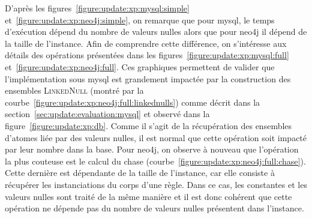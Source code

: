 D'après les figures~\ref{figure:update:xp:mysql:simple} et~\ref{figure:update:xp:neo4j:simple}, on remarque que pour \gls{mysql}, le temps d'exécution dépend du nombre de valeurs nulles alors que pour \gls{neo4j} il dépend de la taille de l'instance.
Afin de comprendre cette différence, on s'intéresse aux détails des opérations présentées dans les figures~\ref{figure:update:xp:mysql:full} et~\ref{figure:update:xp:neo4j:full}.
Ces graphiques permettent de valider que l'implémentation sous \gls{mysql} est grandement impactée par la construction des ensembles \textsc{LinkedNull} (montré par la courbe~\ref{figure:update:xp:neo4j:full:linkednulls}) comme décrit dans la section~\ref{sec:update:evaluation:mysql} et observé dans la figure~\ref{figure:update:xp:db}.
Comme il s'agit de la récupération des ensembles d'atomes liée par des valeurs nulles, il est normal que cette opération soit impacté par leur nombre dans la base.
Pour \gls{neo4j}, on observe à nouveau que l'opération la plus couteuse est le calcul du \gls{chase} (courbe~\ref{figure:update:xp:neo4j:full:chase}).
Cette dernière est dépendante de la taille de l'instance, car elle consiste à récupérer les instanciations du corps d'une règle.
Dans ce cas, les constantes et les valeurs nulles sont traité de la même manière et il est donc cohérent que cette opération ne dépende pas du nombre de valeurs nulles présentent dans l'instance.

